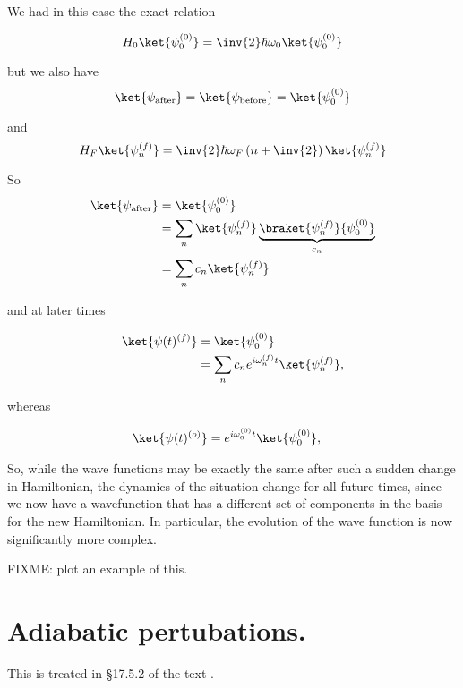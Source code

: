 We had in this case the exact relation

\begin{equation}\label{eqn:qmTwoL8:240}
H_0 \ket{\psi_0^{(0)}} = \inv{2} \hbar \omega_0 \ket{\psi_0^{(0)}}
\end{equation}

but we also have
\begin{equation}\label{eqn:qmTwoL8:260}
\ket{\psi_{\text{after}}} = \ket{\psi_{\text{before}}} = \ket{\psi_0^{(0)}}
\end{equation}

and
\begin{equation}\label{eqn:qmTwoL8:280}
H_F \ket{\psi_n^{(f)}} = \inv{2} \hbar \omega_F \left( n + \inv{2} \right) \ket{\psi_n^{(f)}}
\end{equation}

So
\begin{align*}
\ket{\psi_{\text{after}}}
&=
\ket{\psi_0^{(0)}} \\
&=
\sum_n \ket{\psi_n^{(f)}}
\underbrace{\braket{\psi_n^{(f)}}{\psi_0^{(0)}} }_{c_n} \\
&=
\sum_n c_n \ket{\psi_n^{(f)}}
\end{align*}

and at later times

\begin{align*}
\ket{\psi(t)^{(f)}}
&=
\ket{\psi_0^{(0)}} \\
&=
\sum_n c_n e^{i \omega_n^{(f)} t} \ket{\psi_n^{(f)}},
\end{align*}

whereas

\begin{align*}
\ket{\psi(t)^{(o)}}
&=
e^{i \omega_0^{(0)} t} \ket{\psi_0^{(0)}},
\end{align*}

So, while the wave functions may be exactly the same after such a sudden change in Hamiltonian, the dynamics of the situation change for all future times, since we now have a wavefunction that has a different set of components in the basis for the new Hamiltonian.  In particular, the evolution of the wave function is now significantly more complex.

FIXME: plot an example of this.

\section{Adiabatic pertubations.}

This is treated in \S 17.5.2 of the text \cite{desai2009quantum}.

